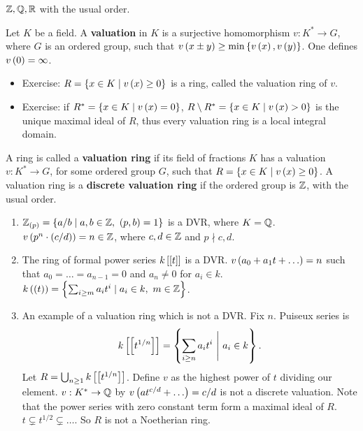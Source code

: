 \begin{example*}
$ \Z, \Q, \R $ with the usual order.
\end{example*}

\begin{definition}
Let $ K $ be a field. A \textbf{valuation} in $ K $ is a surjective homomorphism $ v : K^* \to G $, where $ G $ is an ordered group, such that $ v\rb{x \pm y} \ge \min\cb{v\rb{x}, v\rb{y}} $. One defines $ v\rb{0} = \infty $.
\begin{itemize}
\item Exercise: $ R = \cb{x \in K \mid v\rb{x} \ge 0} $ is a ring, called the valuation ring of $ v $.
\item Exercise: if $ R^* = \cb{x \in K \mid v\rb{x} = 0} $, $ R \setminus R^* = \cb{x \in K \mid v\rb{x} > 0} $ is the unique maximal ideal of $ R $, thus every valuation ring is a local integral domain.
\end{itemize}
\end{definition}

\begin{definition}
A ring is called a \textbf{valuation ring} if its field of fractions $ K $ has a valuation $ v : K^* \to G $, for some ordered group $ G $, such that $ R = \cb{x \in K \mid v\rb{x} \ge 0} $. A valuation ring is a \textbf{discrete valuation ring} if the ordered group is $ \Z $, with the usual order.
\end{definition}

\begin{example*}
\hfill
\begin{enumerate}
\item $ \Z_{\rb{p}} = \cb{a / b \mid a, b \in \Z, \ \rb{p, b} = 1} $ is a DVR, where $ K = \Q $. $ v\rb{p^n \cdot \rb{c / d}} = n \in \Z $, where $ c, d \in \Z $ and $ p \nmid c, d $.
\item The ring of formal power series $ k\sb{\sb{t}} $ is a DVR. $ v\rb{a_0 + a_1t + \dots} = n $ such that $ a_0 = \dots = a_{n - 1} = 0 $ and $ a_n \ne 0 $ for $ a_i \in k $. $ k\rb{\rb{t}} = \cb{\sum_{i \ge m} a_it^i \mid a_i \in k, \ m \in \Z} $.
\item An example of a valuation ring which is not a DVR. Fix $ n $. Puiseux series is
$$ k\sb{\sb{t^{1 / n}}} = \cb{\sum_{i \ge n} a_it^i \ \Bigg| \ a_i \in k}. $$
Let $ R = \bigcup_{n \ge 1} k\sb{\sb{t^{1 / n}}} $. Define $ v $ as the highest power of $ t $ dividing our element. $ v : K^* \to \Q $ by $ v\rb{at^{c / d} + \dots} = c / d $ is not a discrete valuation. Note that the power series with zero constant term form a maximal ideal of $ R $. $ t \subsetneq t^{1 / 2} \subsetneq \dots $. So $ R $ is not a Noetherian ring.
\end{enumerate}
\end{example*}

